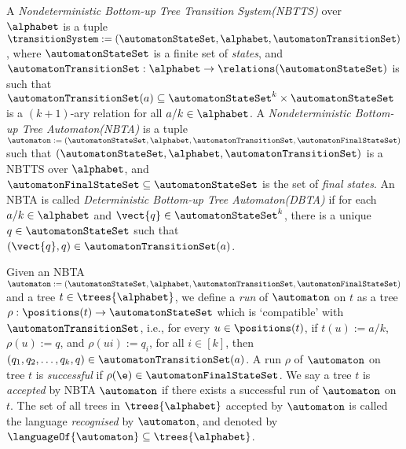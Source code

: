 \begin{definition}\label{def:nbta}
    A \emph{Nondeterministic Bottom-up Tree Transition System(NBTTS)} over \rab\ $\alphabet$ is a tuple $\transitionSystem := (\automatonStateSet, \alphabet, \automatonTransitionSet)$, where $\automatonStateSet$ is a finite set of \emph{states}, and $\automatonTransitionSet : \alphabet \to \relations(\automatonStateSet)$ is such that $\automatonTransitionSet(a) \subseteq \automatonStateSet^k \times \automatonStateSet$ is a $(k+1)$-ary relation for all $a/k \in \alphabet$. A \emph{Nondeterministic Bottom-up Tree Automaton(NBTA)} is a tuple $\automaton := (\automatonStateSet, \alphabet, \automatonTransitionSet, \automatonFinalStateSet)$ such that $(\automatonStateSet, \alphabet, \automatonTransitionSet)$ is a NBTTS over $\alphabet$, and $\automatonFinalStateSet \subseteq \automatonStateSet$ is the set of \emph{final states}. An NBTA is called \emph{Deterministic Bottom-up Tree Automaton(DBTA)} if for each $a/k \in \alphabet$ and $\vect{q} \in \automatonStateSet^k$, there is a unique $q \in \automatonStateSet$ such that $(\vect{q}, q) \in \automatonTransitionSet(a)$.
\end{definition}

\begin{definition}\label{def:runAcceptanceNbta}
    Given an NBTA $\automaton := (\automatonStateSet, \alphabet, \automatonTransitionSet, \automatonFinalStateSet)$ and a tree $t \in \trees{\alphabet}$, we define a \emph{run} of $\automaton$ on $t$ as a tree $\rho : \positions(t) \to \automatonStateSet$ which is `compatible' with $\automatonTransitionSet$, i.e., for every $u \in \positions(t)$, if $t(u) := a/k$, $\rho(u) := q$, and $\rho(ui) := q_i$, for all $i \in [k]$, then $(q_1, q_2, \dots, q_k, q) \in \automatonTransitionSet(a)$. A run $\rho$ of $\automaton$ on tree $t$ is \emph{successful} if $\rho(\e) \in \automatonFinalStateSet$. We say a tree $t$ is \emph{accepted} by NBTA $\automaton$ if there exists a successful run of $\automaton$ on $t$. The set of all trees in $\trees{\alphabet}$ accepted by $\automaton$ is called the language \emph{recognised} by $\automaton$, and denoted by $\languageOf{\automaton} \subseteq \trees{\alphabet}$.
\end{definition}



